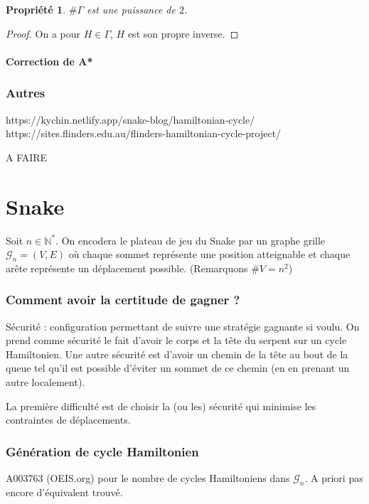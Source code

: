 \documentclass[french,a4paper]{article}
\newtheorem{property}{Propriété}[section]
\newtheorem{proof}{Preuve}[section]
\begin{document}
\begin{property}
$\# \Gamma$ est une puissance de $2$.
\end{property}

\begin{proof}
On a pour $H \in \Gamma$, $H$ est son propre inverse.
\end{proof}


\subsection{Correction de A*}



\section{Autres}
https://kychin.netlify.app/snake-blog/hamiltonian-cycle/
https://sites.flinders.edu.au/flinders-hamiltonian-cycle-project/

A FAIRE



\newpage
\part{Snake}
Soit $n \in \mathbb{N}^*$.
On encodera le plateau de jeu du Snake par un graphe grille $\mathcal{G}_n=(V,E)$ où chaque sommet représente une position atteignable et chaque arête représente un déplacement possible.
(Remarquons $\# V=n^{2}$)


\section{Comment avoir la certitude de gagner ?}
Sécurité : configuration permettant de suivre une stratégie gagnante si voulu.
On prend comme sécurité le fait d'avoir le corps et la tête du serpent sur un cycle Hamiltonien. Une autre sécurité est d'avoir un chemin de la tête au bout de la queue tel qu'il est possible d'éviter un sommet de ce chemin (en en prenant un autre localement).

La première difficulté est de choisir la (ou les) sécurité qui minimise les contraintes de déplacements.


\section{Génération de cycle Hamiltonien}

A003763 (OEIS.org) pour le nombre de cycles Hamiltoniens dans $\mathcal{G}_n$. A priori pas encore d'équivalent trouvé.
\end{document}
